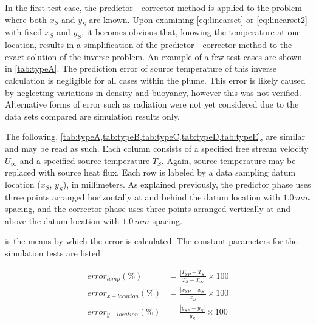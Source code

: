 \documentclass[preprint,12pt]{elsarticle}
\begin{document}
In the first test case, the predictor - corrector method is applied to the problem where both $x_S$ and $y_S$ are known.  Upon examining \cref{eq:linearset} or \cref{eq:linearset2} with fixed $x_S$ and $y_S$, it becomes obvious that, knowing the temperature at one location, results in a simplification of the predictor - corrector method to the exact solution of the inverse problem.  An example of a few test cases are shown in \cref{tab:typeA}.  The prediction error of source temperature of this inverse calculation is negligible for all cases within the plume.  This error is likely caused by neglecting variations in density and buoyancy, however this was not verified.  Alternative forms of error such as radiation were not yet considered due to the data sets compared are simulation results only.

The following, \cref{tab:typeA,tab:typeB,tab:typeC,tab:typeD,tab:typeE},  are similar and may be read as such.  Each column consists of a specified free stream velocity $U_{\infty}$ and a specified source temperature $T_S$.  Again, source temperature may be replaced with source heat flux.  Each row is labeled by a data sampling datum location ($x_S$, $y_S$), in millimeters.  As explained previously, the predictor phase uses three points arranged horizontally at and behind the datum location with $1.0\,mm$ spacing, and the corrector phase uses three points arranged vertically at and above the datum location with $1.0\,mm$ spacing.

 is the means by which the error is calculated.  The constant parameters for the simulation tests are listed 

\begin{subequations}
\begin{align}
error_{temp} (\%) &= \frac{\left|T_{SP}-T_S\right| }{T_S-T_{\infty}} \times 100 \\
error_{x-location} (\%) &= \frac{\left|x_{SP}-x_S\right|}{x_S} \times 100 \\
error_{y-location} (\%) &= \frac{\left|y_{SP}-y_S\right|}{y_S} \times 100 
\end{align}
\label{eq:error}
\end{subequations}
\end{document}
